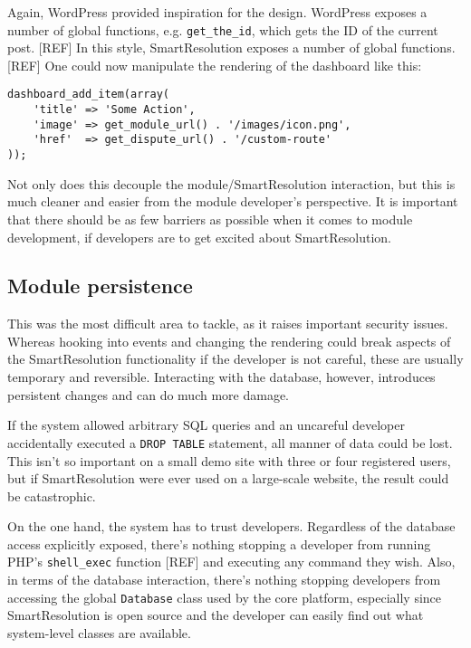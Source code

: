 Again, WordPress provided inspiration for the design. WordPress exposes a number of global functions, e.g. \lstinline{get_the_id}, which gets the ID of the current post. [REF] In this style, SmartResolution exposes a number of global functions. [REF] One could now manipulate the rendering of the dashboard like this: %

\begin{lstlisting}
dashboard_add_item(array(
    'title' => 'Some Action',
    'image' => get_module_url() . '/images/icon.png',
    'href'  => get_dispute_url() . '/custom-route'
));
\end{lstlisting}

Not only does this decouple the module/SmartResolution interaction, but this is much cleaner and easier from the module developer's perspective. It is important that there should be as few barriers as possible when it comes to module development, if developers are to get excited about SmartResolution.

\subsection{Module persistence}

This was the most difficult area to tackle, as it raises important security issues. Whereas hooking into events and changing the rendering could break aspects of the SmartResolution functionality if the developer is not careful, these are usually temporary and reversible. Interacting with the database, however, introduces persistent changes and can do much more damage.

If the system allowed arbitrary SQL queries and an uncareful developer accidentally executed a \lstinline{DROP TABLE} statement, all manner of data could be lost. This isn't so important on a small demo site with three or four registered users, but if SmartResolution were ever used on a large-scale website, the result could be catastrophic.

On the one hand, the system has to trust developers. Regardless of the database access explicitly exposed, there's nothing stopping a developer from running PHP's \lstinline{shell_exec} function [REF] and executing any command they wish. Also, in terms of the database interaction, there's nothing stopping developers from accessing the global \lstinline{Database} class used by the core platform, especially since SmartResolution is open source and the developer can easily find out what system-level classes are available.

